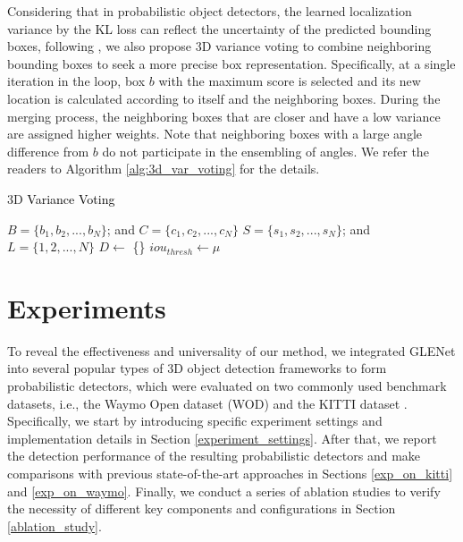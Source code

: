 \documentclass[twocolumn]{svjour3}
\newcommand{\revise}[1]{\textcolor{black}{#1}}
\begin{document}
Considering that in probabilistic object detectors, the learned localization variance by the KL loss can reflect the uncertainty of the predicted bounding boxes, following \citep{bbr}, we also propose 3D variance voting to combine neighboring bounding boxes to seek a more precise box representation. Specifically, at a single iteration in the loop, box $b$ with the maximum score is selected and its new location is calculated according to itself and the neighboring boxes.
During the merging process, the neighboring boxes that are closer and have a low variance are assigned higher weights. 
Note that neighboring boxes with a large angle difference from $b$ do not participate in the ensembling of angles. We refer the readers to Algorithm \ref{alg:3d_var_voting} for the details.
\begin{algorithm}[t]
\SetAlgoLined
\caption{3D \revise{Variance Voting}}\label{alg:3d_var_voting}
$B=\{b_1,b_2,...,b_N\}$; and $C=\{c_1,c_2,...,c_N\}$\;
$S = \{s_1,s_2,...,s_N\}$; and $L=\{1,2,...,N\}$\;
$D\leftarrow$ \{\}\;
$iou_{thresh}\leftarrow \mu$\;
\end{algorithm}

\vspace{-0.5cm}
\section{Experiments} \label{experiments}

To reveal the effectiveness and universality of our method, we integrated GLENet into several popular types of 3D object detection frameworks to form probabilistic detectors, which were evaluated on two commonly used benchmark datasets, i.e., the Waymo Open dataset (WOD) \citep{Sun_2020_CVPR} and the KITTI dataset \citep{Geiger_KITTI}. Specifically, we start by introducing specific experiment settings and implementation details in Section \ref{experiment_settings}. After that, we report the detection performance of the resulting probabilistic detectors and make comparisons with previous state-of-the-art approaches in Sections \ref{exp_on_kitti} and \ref{exp_on_waymo}. Finally, we conduct a series of ablation studies to verify the necessity of different key components and configurations in Section \ref{ablation_study}.
\end{document}
